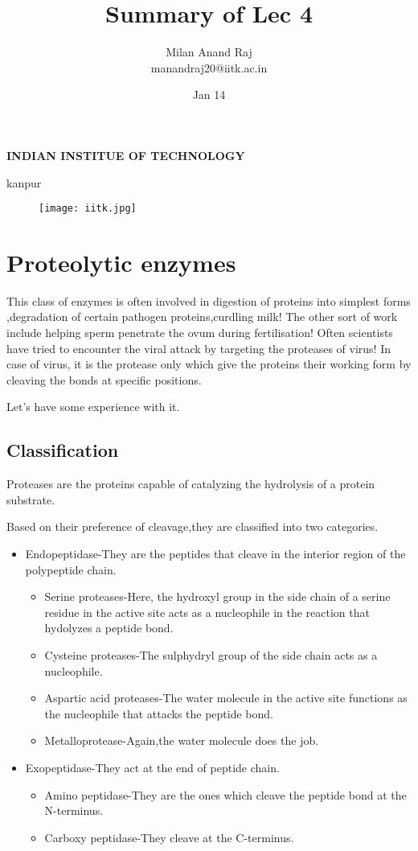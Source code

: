 \documentclass[12pt]{article}
\title{Summary of Lec 4}
\author{Milan Anand Raj\\manandraj20@iitk.ac.in}
\date{Jan 14}
\begin{document}
\NoBgThispage
\maketitle



\begin{center}
\textbf{INDIAN INSTITUE OF TECHNOLOGY}

kanpur
\end{center}


\vfill
\begin{figure}
\centering
\texttt{[image: iitk.jpg]}
\end{figure}
\clearpage
\tableofcontents
\clearpage
\NoBgThispage
\section{Proteolytic enzymes}
This class of enzymes is often involved in digestion of proteins into simplest forms ,degradation of certain pathogen proteins,curdling milk!
The other sort of work include helping sperm penetrate the ovum during fertilisation!
Often scientists have tried to encounter the viral attack by targeting the proteases of virus! In case of virus, it is the protease only which give the proteins their working form by cleaving the bonds at specific positions.

Let's have some experience with it.



\subsection{Classification }
Proteases are the proteins capable of catalyzing the hydrolysis of a protein substrate.

Based on their preference of cleavage,they are classified into two categories.
\begin{itemize}
\item Endopeptidase-They are the peptides that cleave in the interior region of the polypeptide chain.
\begin{itemize}
\item Serine proteases-Here, the hydroxyl group in the side chain of a serine residue in the active site acts as a nucleophile in the reaction that hydolyzes a peptide bond.
\item Cysteine proteases-The sulphydryl group of the side chain acts as a nucleophile.
\item Aspartic acid proteases-The water molecule in the active site functions as the nucleophile that attacks the peptide bond.
\item Metalloprotease-Again,the water molecule does the job.
\end{itemize}
\item Exopeptidase-They act at the end of peptide chain.
\begin{itemize}
\item Amino peptidase-They are the ones which cleave the peptide bond at the N-terminus.
\item Carboxy peptidase-They cleave at the C-terminus.
\end{itemize}
\end{itemize}
\end{document}
